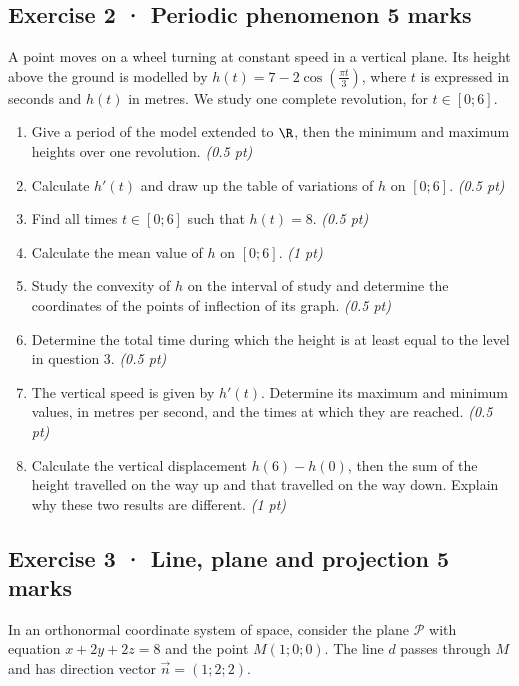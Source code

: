 \subsection*{Exercise 2 · Periodic phenomenon \hfill 5 marks}A point moves on a wheel turning at constant speed in a vertical plane. Its height above the ground is modelled by $h(t)=7-2\cos\left(\frac{\pi t}{3}\right)$, where $t$ is expressed in seconds and $h(t)$ in metres. We study one complete revolution, for $t\in[0;6]$.

\begin{enumerate}

\item Give a period of the model extended to $\R$, then the minimum and maximum heights over one revolution. \hfill\textit{(0.5 pt)}

\item Calculate $h'(t)$ and draw up the table of variations of $h$ on $[0;6]$. \hfill\textit{(0.5 pt)}

\item Find all times $t\in[0;6]$ such that $h(t)=8$. \hfill\textit{(0.5 pt)}

\item Calculate the mean value of $h$ on $[0;6]$. \hfill\textit{(1 pt)}

\item Study the convexity of $h$ on the interval of study and determine the coordinates of the points of inflection of its graph. \hfill\textit{(0.5 pt)}

\item Determine the total time during which the height is at least equal to the level in question 3. \hfill\textit{(0.5 pt)}

\item The vertical speed is given by $h'(t)$. Determine its maximum and minimum values, in metres per second, and the times at which they are reached. \hfill\textit{(0.5 pt)}

\item Calculate the vertical displacement $h(6)-h(0)$, then the sum of the height travelled on the way up and that travelled on the way down. Explain why these two results are different. \hfill\textit{(1 pt)}

\end{enumerate}

\clearpage{}\par

\subsection*{Exercise 3 · Line, plane and projection \hfill 5 marks}In an orthonormal coordinate system of space, consider the plane $\mathcal P$ with equation $x+2y+2z=8$ and the point $M(1;0;0)$. The line $d$ passes through $M$ and has direction vector $\vec n=(1;2;2)$.

